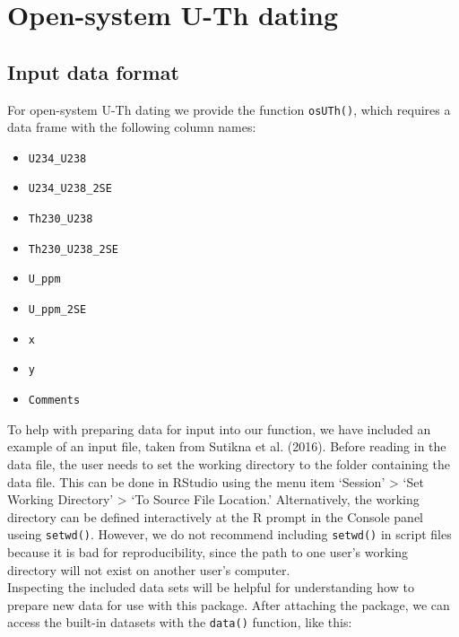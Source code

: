 \documentclass[]{elsarticle} %
\providecommand{\tightlist}{%
  \setlength{\itemsep}{0pt}\setlength{\parskip}{0pt}}
\begin{document}
\FloatBarrier

\newpage

\hypertarget{open-system-u-th-dating}{%
\section{Open-system U-Th dating}\label{open-system-u-th-dating}}

\hypertarget{input-data-format-1}{%
\subsection{Input data format}\label{input-data-format-1}}

For open-system U-Th dating we provide the function \texttt{osUTh()}, which requires a data frame with the following column names:

\begin{itemize}
\tightlist
\item
  \texttt{U234\_U238}
\item
  \texttt{U234\_U238\_2SE}
\item
  \texttt{Th230\_U238}
\item
  \texttt{Th230\_U238\_2SE}
\item
  \texttt{U\_ppm}
\item
  \texttt{U\_ppm\_2SE}
\item
  \texttt{x}
\item
  \texttt{y}
\item
  \texttt{Comments}
\end{itemize}

To help with preparing data for input into our function, we have included an example of an input file, taken from Sutikna et al. (2016). Before reading in the data file, the user needs to set the working directory to the folder containing the data file. This can be done in RStudio using the menu item `Session' \textgreater{} `Set Working Directory' \textgreater{} `To Source File Location.' Alternatively, the working directory can be defined interactively at the R prompt in the Console panel useing \texttt{setwd()}. However, we do not recommend including \texttt{setwd()} in script files because it is bad for reproducibility, since the path to one user's working directory will not exist on another user's computer.\\
Inspecting the included data sets will be helpful for understanding how to prepare new data for use with this package. After attaching the package, we can access the built-in datasets with the \texttt{data()} function, like this:
\end{document}
